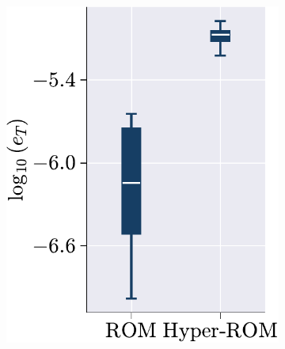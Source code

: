 \documentclass[11pt]{article}
\begin{document}
\begin{figure}[t!]
\begin{subfigure}[b]{0.33\linewidth}
                    \includegraphics[height=1.3\linewidth]{error_comp_rom_hrom_ecm.pdf}
                    \caption{}
                    \label{fig:HROM_ERROR_SPDUP__ecm_a}
                \end{subfigure}
                \begin{subfigure}[b]{0.33\linewidth}
                    \centering

\end{subfigure}
\end{figure}
\end{document}
